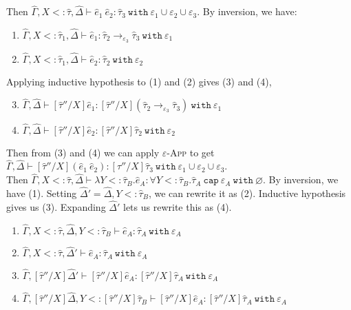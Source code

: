 \documentclass{llncs}
\newcommand{\keywadj}[1]{\mathtt{#1}}
\newcommand{\keyw}[1]{\keywadj{#1}~}
\newcommand{\kw}[1]{\keyw{ #1 }}
\begin{document}
 Then $\hat \Gamma, X <: \hat \tau, \hat \Delta \vdash \hat e_1~\hat e_2: \hat \tau_3~\kw{with} \varepsilon_1 \cup \varepsilon_2 \cup \varepsilon_3$. By inversion, we have:

\begin{enumerate}
	\item $\hat \Gamma, X <: \hat \tau_1, \hat \Delta \vdash \hat e_1: \hat \tau_2 \rightarrow_{\varepsilon_3} \hat \tau_3~\kw{with} \varepsilon_1$
	\item $\hat \Gamma, X <: \hat \tau_1, \hat \Delta \vdash \hat e_2: \hat \tau_2~\kw{with} \varepsilon_2$
\end{enumerate}

Applying inductive hypothesis to (1) and (2) gives (3) and (4),

\begin{enumerate}
	\setcounter{enumi}{2}
	\item $\hat \Gamma, \hat \Delta \vdash [\hat \tau''/X]\hat e_1: [\hat \tau''/X](\hat \tau_2 \rightarrow_{\varepsilon_3} \hat \tau_3)~\kw{with} \varepsilon_1$
	\item $\hat \Gamma, \hat \Delta \vdash [\hat \tau''/X]\hat e_2:  [\hat \tau''/X]\hat \tau_2~\kw{with} \varepsilon_2$
\end{enumerate}

Then from (3) and (4) we can apply \textsc{$\varepsilon$-App} to get $\hat \Gamma, \hat \Delta \vdash [\hat \tau''/X](\hat e_1~\hat e_2) : [\hat \tau''/X]\hat \tau_3~\kw{with} \varepsilon_1 \cup \varepsilon_2 \cup \varepsilon_3$. \\

 Then $\hat \Gamma, X <: \hat \tau, \hat \Delta \vdash \lambda Y <: \hat \tau_B. \hat e_A: \forall Y <: \hat \tau_B. \hat \tau_A~\kw{cap} \varepsilon_A~\kw{with} \varnothing$. By inversion, we have (1). Setting $\hat \Delta' = \hat \Delta, Y <: \hat \tau_B$, we can rewrite it as (2). Inductive hypothesis gives us (3). Expanding $\hat \Delta'$ lets us rewrite this as (4).

\begin{enumerate}
	\item $\hat \Gamma, X <: \hat \tau, \hat \Delta, Y <: \hat \tau_B \vdash \hat e_A: \hat \tau_A~\kw{with} \varepsilon_A$ 
	\item $\hat \Gamma, X <: \hat \tau, \hat \Delta' \vdash \hat e_A: \hat \tau_A~\kw{with} \varepsilon_A$
	\item $\hat \Gamma, [\hat \tau''/X]\hat \Delta' \vdash [\hat \tau''/X]\hat e_A: [\hat \tau''/X]\hat \tau_A~\kw{with} \varepsilon_A$
	\item $\hat \Gamma, [\hat \tau''/X]\hat \Delta, Y <: [\hat \tau''/X] \hat \tau_B \vdash [\hat \tau''/X]\hat e_A: [\hat \tau''/X]\hat \tau_A~\kw{with} \varepsilon_A$
\end{enumerate}
\end{document}
